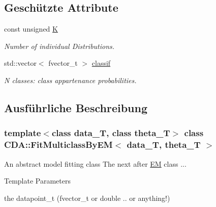 \subsection*{Geschützte Attribute}
\begin{DoxyCompactItemize}
\item 
\hypertarget{classCDA_1_1FitMulticlassByEM_a315d727c0edf745ae12f63a20db0e79e}{
const unsigned \hyperlink{classCDA_1_1FitMulticlassByEM_a315d727c0edf745ae12f63a20db0e79e}{K}}
\label{classCDA_1_1FitMulticlassByEM_a315d727c0edf745ae12f63a20db0e79e}

\begin{DoxyCompactList}\small\item\em Number of individual Distributions. \item\end{DoxyCompactList}\item 
\hypertarget{classCDA_1_1FitMulticlassByEM_aebd80b2bdf01b62d279023cfb50cf3e6}{
std::vector$<$ fvector\_\-t $>$ \hyperlink{classCDA_1_1FitMulticlassByEM_aebd80b2bdf01b62d279023cfb50cf3e6}{classif}}
\label{classCDA_1_1FitMulticlassByEM_aebd80b2bdf01b62d279023cfb50cf3e6}

\begin{DoxyCompactList}\small\item\em N classes: class appartenance probabilities. \item\end{DoxyCompactList}\end{DoxyCompactItemize}


\subsection{Ausführliche Beschreibung}
\subsubsection*{template$<$class data\_\-T, class theta\_\-T$>$ class CDA::FitMulticlassByEM$<$ data\_\-T, theta\_\-T $>$}

An abstract model fitting class The next after \hyperlink{classCDA_1_1EM}{EM} class ... 
\begin{DoxyTemplParams}{Template Parameters}
\item[{\em }]the datapoint\_\-t (fvector\_\-t or double .. or anything!) \end{DoxyTemplParams}


